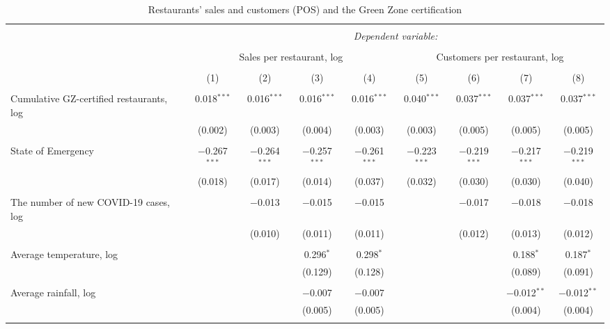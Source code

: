 
\begin{table}[!htbp] \centering 
  \caption{Restaurants' sales and customers (POS) and the Green Zone certification} 
  \label{} 
\scriptsize 
\begin{tabular}{@{\extracolsep{1pt}}lcccccccc} 
\\[-1.8ex]\hline 
\hline \\[-1.8ex] 
 & \multicolumn{8}{c}{\textit{Dependent variable:}} \\ 
\cline{2-9} 
\\[-1.8ex] & \multicolumn{4}{c}{Sales per restaurant, log} & \multicolumn{4}{c}{Customers per restaurant, log} \\ 
\\[-1.8ex] & (1) & (2) & (3) & (4) & (5) & (6) & (7) & (8)\\ 
\hline \\[-1.8ex] 
 Cumulative GZ-certified restaurants, log & 0.018$^{***}$ & 0.016$^{***}$ & 0.016$^{***}$ & 0.016$^{***}$ & 0.040$^{***}$ & 0.037$^{***}$ & 0.037$^{***}$ & 0.037$^{***}$ \\ 
  & (0.002) & (0.003) & (0.004) & (0.003) & (0.003) & (0.005) & (0.005) & (0.005) \\ 
  & & & & & & & & \\ 
 State of Emergency & $-$0.267$^{***}$ & $-$0.264$^{***}$ & $-$0.257$^{***}$ & $-$0.261$^{***}$ & $-$0.223$^{***}$ & $-$0.219$^{***}$ & $-$0.217$^{***}$ & $-$0.219$^{***}$ \\ 
  & (0.018) & (0.017) & (0.014) & (0.037) & (0.032) & (0.030) & (0.030) & (0.040) \\ 
  & & & & & & & & \\ 
 The number of new COVID-19 cases, log &  & $-$0.013 & $-$0.015 & $-$0.015 &  & $-$0.017 & $-$0.018 & $-$0.018 \\ 
  &  & (0.010) & (0.011) & (0.011) &  & (0.012) & (0.013) & (0.012) \\ 
  & & & & & & & & \\ 
 Average temperature, log &  &  & 0.296$^{*}$ & 0.298$^{*}$ &  &  & 0.188$^{*}$ & 0.187$^{*}$ \\ 
  &  &  & (0.129) & (0.128) &  &  & (0.089) & (0.091) \\ 
  & & & & & & & & \\ 
 Average rainfall, log &  &  & $-$0.007 & $-$0.007 &  &  & $-$0.012$^{**}$ & $-$0.012$^{**}$ \\ 
  &  &  & (0.005) & (0.005) &  &  & (0.004) & (0.004) \\ 
  & & & & & & & & \\ 

\end{tabular}
\end{table}
